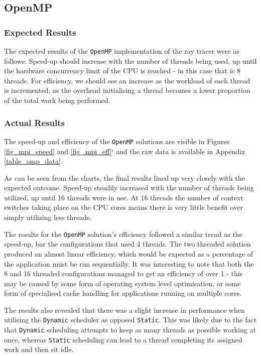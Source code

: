 \documentclass[journal,transmag]{IEEEtran}
\begin{document}
	
		

	\subsection{OpenMP}
		\subsubsection{Expected Results}
			The expected results of the \texttt{OpenMP} implementation of the ray tracer were as follows:
			Speed-up should increase with the number of threads being used, up until the hardware concurrency limit of the CPU is reached - in this case that is 8 threads.
			For efficiency, we should see an increase as the workload of each thread is incremented, as the overhead initialising a thread becomes a lower proportion of the total work being performed.
		
		\subsubsection{Actual Results}
			The speed-up and efficiency of the \texttt{OpenMP} solutions are visible in Figures \ref{fig_mpi_speed} and \ref{fig_mpi_eff}` and the raw data is available in Appendix \ref{table_omp_data}.
			
			As can be seen from the charts, the final results lined up very closely with the expected outcome. Speed-up steadily increased with the number of threads being utilized, up until 16 threads were in use. At 16 threads the number of context switches taking place on the CPU cores means there is very little benefit over simply utilizing less threads.
			
			The results for the \texttt{OpenMP} solution's efficiency followed a similar trend as the speed-up, bar the configurations that used 4 threads. The two threaded solution produced an almost linear efficiency, which would be expected as a percentage of the application must be run sequentially. It was interesting to note that both the 8 and 16 threaded configurations managed to get an efficiency of over 1 - this may be caused by some form of operating system level optimisation, or some form of specialised cache handling for applications running on multiple cores.
			
			The results also revealed that there was a slight increase in performance when utilising the \texttt{Dynamic} scheduler as opposed \texttt{Static}. This was likely due to the fact that \texttt{Dynamic} scheduling attempts to keep as many threads as possible working at once, whereas \texttt{Static} scheduling can lead to a thread completing its assigned work and then sit idle.
			
\end{document}
